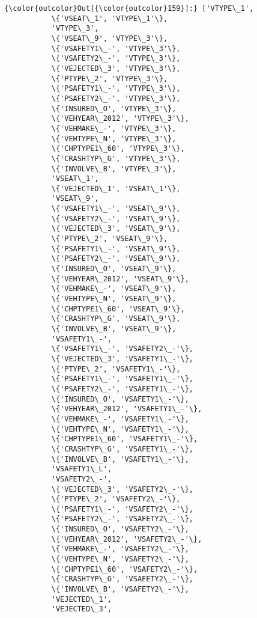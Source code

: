 \documentclass[11pt]{article}
\begin{document}
\begin{Verbatim}[commandchars=\\\{\}]
{\color{outcolor}Out[{\color{outcolor}159}]:} ['VTYPE\_1',
           \{'VSEAT\_1', 'VTYPE\_1'\},
           'VTYPE\_3',
           \{'VSEAT\_9', 'VTYPE\_3'\},
           \{'VSAFETY1\_-', 'VTYPE\_3'\},
           \{'VSAFETY2\_-', 'VTYPE\_3'\},
           \{'VEJECTED\_3', 'VTYPE\_3'\},
           \{'PTYPE\_2', 'VTYPE\_3'\},
           \{'PSAFETY1\_-', 'VTYPE\_3'\},
           \{'PSAFETY2\_-', 'VTYPE\_3'\},
           \{'INSURED\_O', 'VTYPE\_3'\},
           \{'VEHYEAR\_2012', 'VTYPE\_3'\},
           \{'VEHMAKE\_-', 'VTYPE\_3'\},
           \{'VEHTYPE\_N', 'VTYPE\_3'\},
           \{'CHPTYPE1\_60', 'VTYPE\_3'\},
           \{'CRASHTYP\_G', 'VTYPE\_3'\},
           \{'INVOLVE\_B', 'VTYPE\_3'\},
           'VSEAT\_1',
           \{'VEJECTED\_1', 'VSEAT\_1'\},
           'VSEAT\_9',
           \{'VSAFETY1\_-', 'VSEAT\_9'\},
           \{'VSAFETY2\_-', 'VSEAT\_9'\},
           \{'VEJECTED\_3', 'VSEAT\_9'\},
           \{'PTYPE\_2', 'VSEAT\_9'\},
           \{'PSAFETY1\_-', 'VSEAT\_9'\},
           \{'PSAFETY2\_-', 'VSEAT\_9'\},
           \{'INSURED\_O', 'VSEAT\_9'\},
           \{'VEHYEAR\_2012', 'VSEAT\_9'\},
           \{'VEHMAKE\_-', 'VSEAT\_9'\},
           \{'VEHTYPE\_N', 'VSEAT\_9'\},
           \{'CHPTYPE1\_60', 'VSEAT\_9'\},
           \{'CRASHTYP\_G', 'VSEAT\_9'\},
           \{'INVOLVE\_B', 'VSEAT\_9'\},
           'VSAFETY1\_-',
           \{'VSAFETY1\_-', 'VSAFETY2\_-'\},
           \{'VEJECTED\_3', 'VSAFETY1\_-'\},
           \{'PTYPE\_2', 'VSAFETY1\_-'\},
           \{'PSAFETY1\_-', 'VSAFETY1\_-'\},
           \{'PSAFETY2\_-', 'VSAFETY1\_-'\},
           \{'INSURED\_O', 'VSAFETY1\_-'\},
           \{'VEHYEAR\_2012', 'VSAFETY1\_-'\},
           \{'VEHMAKE\_-', 'VSAFETY1\_-'\},
           \{'VEHTYPE\_N', 'VSAFETY1\_-'\},
           \{'CHPTYPE1\_60', 'VSAFETY1\_-'\},
           \{'CRASHTYP\_G', 'VSAFETY1\_-'\},
           \{'INVOLVE\_B', 'VSAFETY1\_-'\},
           'VSAFETY1\_L',
           'VSAFETY2\_-',
           \{'VEJECTED\_3', 'VSAFETY2\_-'\},
           \{'PTYPE\_2', 'VSAFETY2\_-'\},
           \{'PSAFETY1\_-', 'VSAFETY2\_-'\},
           \{'PSAFETY2\_-', 'VSAFETY2\_-'\},
           \{'INSURED\_O', 'VSAFETY2\_-'\},
           \{'VEHYEAR\_2012', 'VSAFETY2\_-'\},
           \{'VEHMAKE\_-', 'VSAFETY2\_-'\},
           \{'VEHTYPE\_N', 'VSAFETY2\_-'\},
           \{'CHPTYPE1\_60', 'VSAFETY2\_-'\},
           \{'CRASHTYP\_G', 'VSAFETY2\_-'\},
           \{'INVOLVE\_B', 'VSAFETY2\_-'\},
           'VEJECTED\_1',
           'VEJECTED\_3',

\end{Verbatim}
\end{document}
